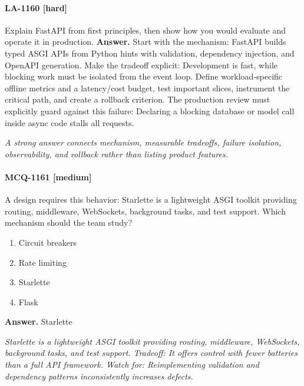 \paragraph{LA-1160 [hard]} Explain FastAPI from first principles, then show how you would evaluate and operate it in production.
\noindent\textbf{Answer.} Start with the mechanism: FastAPI builds typed ASGI APIs from Python hints with validation, dependency injection, and OpenAPI generation. Make the tradeoff explicit: Development is fast, while blocking work must be isolated from the event loop. Define workload-specific offline metrics and a latency/cost budget, test important slices, instrument the critical path, and create a rollback criterion. The production review must explicitly guard against this failure: Declaring a blocking database or model call inside async code stalls all requests.
\par\textit{A strong answer connects mechanism, measurable tradeoffs, failure isolation, observability, and rollback rather than listing product features.}
\paragraph{MCQ-1161 [medium]} A design requires this behavior: Starlette is a lightweight ASGI toolkit providing routing, middleware, WebSockets, background tasks, and test support. Which mechanism should the team study?
\begin{enumerate}[label=\Alph*.]
\item Circuit breakers
\item Rate limiting
\item Starlette
\item Flask
\end{enumerate}
\noindent\textbf{Answer.} Starlette
\par\textit{Starlette is a lightweight ASGI toolkit providing routing, middleware, WebSockets, background tasks, and test support. Tradeoff: It offers control with fewer batteries than a full API framework. Watch for: Reimplementing validation and dependency patterns inconsistently increases defects.}
